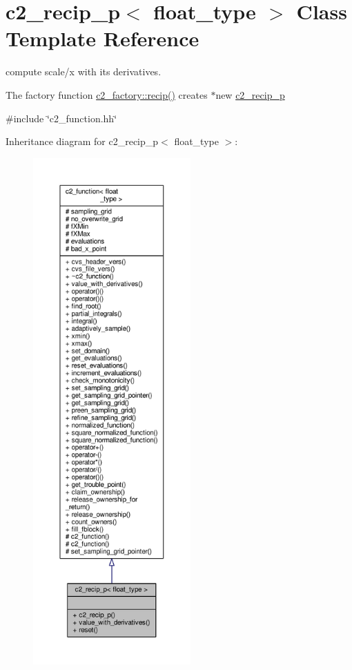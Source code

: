 \hypertarget{classc2__recip__p}{}\section{c2\+\_\+recip\+\_\+p$<$ float\+\_\+type $>$ Class Template Reference}
\label{classc2__recip__p}


compute scale/x with its derivatives.

The factory function \hyperlink{classc2__factory_adda01279d6b1059843e2aecc5be5d95e}{c2\+\_\+factory\+::recip()} creates $\ast$new \hyperlink{classc2__recip__p}{c2\+\_\+recip\+\_\+p}  




{\ttfamily \#include \char`\"{}c2\+\_\+function.\+hh\char`\"{}}



Inheritance diagram for c2\+\_\+recip\+\_\+p$<$ float\+\_\+type $>$\+:
\nopagebreak
\begin{figure}[H]
\begin{center}
\leavevmode
\includegraphics[height=550pt]{classc2__recip__p__inherit__graph}
\end{center}
\end{figure}


